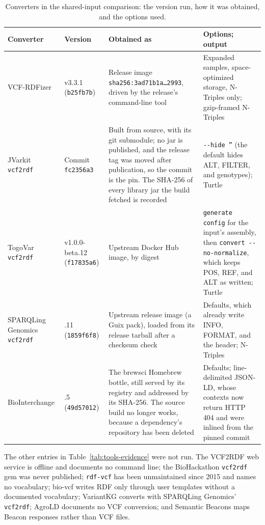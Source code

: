 \documentclass[11pt]{article}
\newcommand{\rowsep}{\noalign{\vskip2pt{\color{black!22}\hrule height 0.4pt}\vskip2pt}}%
\begin{document}
\begin{table}[!htbp]
\caption{Converters in the shared-input comparison: the version run, how it was obtained, and the options used.}\label{tab:converters-tools}%
\centering\footnotesize\setlength{\tabcolsep}{4pt}\renewcommand{\arraystretch}{1.1}\renewcommand{\tabularxcolumn}[1]{m{#1}}%
\begin{tabularx}{\textwidth}{@{}>{\raggedright\arraybackslash}m{}>{\raggedright\arraybackslash}m{}>{\raggedright\arraybackslash}X>{\raggedright\arraybackslash}m{}@{}}
\toprule
\textbf{Converter} & \textbf{Version} & \textbf{Obtained as} & \textbf{Options; output}\\
\midrule
VCF-RDFizer & v3.3.1 (\texttt{b25fb7b}) & Release image \texttt{sha256:3ad71b1a\ldots2993}, driven by the release's command-line tool & Expanded samples, space-optimized storage, N-Triples only; gzip-framed N-Triples\\
\rowsep
JVarkit \texttt{vcf2rdf} \cite{JVarkit_2015} & Commit \texttt{fc2356a3} & Built from source, with its git submodule; no jar is published, and the release tag was moved after publication, so the commit is the pin. The SHA-256 of every library jar the build fetched is recorded & \texttt{-{}-hide ''} (the default hides ALT, FILTER, and genotypes); Turtle\\
\rowsep
TogoVar \texttt{vcf2rdf} \cite{togovar_2022} & v1.0.0-beta.12 (\texttt{f17835a6}) & Upstream Docker Hub image, by digest & \texttt{generate config} for the input's assembly, then \texttt{convert -{}-no-normalize}, which keeps POS, REF, and ALT as written; Turtle\\
\rowsep
SPARQLing Genomics \texttt{vcf2rdf} \cite{sparqling_genomics_software} & 0.99.11 (\texttt{1859f6f8}) & Upstream release image (a Guix pack), loaded from its release tarball after a checksum check & Defaults, which already write INFO, FORMAT, and the header; N-Triples\\
\rowsep
BioInterchange \cite{biointerchange2_software} & 2.0.5 (\texttt{49d57012}) & The brewsci Homebrew bottle, still served by its registry and addressed by its SHA-256. The source build no longer works, because a dependency's repository has been deleted & Defaults; line-delimited JSON-LD, whose contexts now return HTTP 404 and were inlined from the pinned commit\\
\bottomrule
\end{tabularx}
\end{table}

The other entries in Table~\ref{tab:tools-evidence} were not run.
The VCF2RDF web service is offline and documents no command line; the BioHackathon \texttt{vcf2rdf} gem was never published; \texttt{rdf-vcf} has been unmaintained since 2015 and names no vocabulary; bio-vcf writes RDF only through user templates without a documented vocabulary; VariantKG converts with SPARQLing Genomics' \texttt{vcf2rdf}; AgroLD documents no VCF conversion; and Semantic Beacons maps Beacon responses rather than VCF files.
\end{document}
